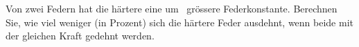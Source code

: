 Von zwei Federn hat die härtere eine um \pHO\ grössere Federkonstante. Berechnen Sie, wie viel weniger (in Prozent) sich die härtere Feder ausdehnt, wenn beide mit der gleichen Kraft gedehnt werden.
